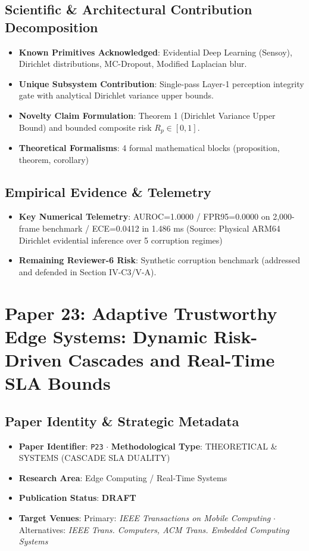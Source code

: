 \documentclass[11pt,a4paper]{article}
\begin{document}
\subsection*{Scientific & Architectural Contribution Decomposition}
\begin{itemize}[leftmargin=1.5em, itemsep=0.2em]
    \item \textbf{Known Primitives Acknowledged}: Evidential Deep Learning (Sensoy), Dirichlet distributions, MC-Dropout, Modified Laplacian blur.
    \item \textbf{Unique Subsystem Contribution}: Single-pass Layer-1 perception integrity gate with analytical Dirichlet variance upper bounds.
    \item \textbf{Novelty Claim Formulation}: Theorem 1 (Dirichlet Variance Upper Bound) and bounded composite risk $R_p \in [0,1]$.
    \item \textbf{Theoretical Formalisms}: 4 formal mathematical blocks (proposition, theorem, corollary)
\end{itemize}

\subsection*{Empirical Evidence & Telemetry}
\begin{itemize}[leftmargin=1.5em, itemsep=0.2em]
    \item \textbf{Key Numerical Telemetry}: AUROC=1.0000 / FPR95=0.0000 on 2,000-frame benchmark / ECE=0.0412 in 1.486 ms (Source: Physical ARM64 Dirichlet evidential inference over 5 corruption regimes)
    \item \textbf{Remaining Reviewer-6 Risk}: Synthetic corruption benchmark (addressed and defended in Section IV-C3/V-A).
\end{itemize}

\section{Paper 23: Adaptive Trustworthy Edge Systems: Dynamic Risk-Driven Cascades and Real-Time SLA Bounds}

\subsection*{Paper Identity \& Strategic Metadata}
\begin{itemize}[leftmargin=1.5em, itemsep=0.2em]
    \item \textbf{Paper Identifier}: \texttt{P23} $\cdot$ \textbf{Methodological Type}: THEORETICAL \& SYSTEMS (CASCADE SLA DUALITY)
    \item \textbf{Research Area}: Edge Computing / Real-Time Systems
    \item \textbf{Publication Status}: \textbf{DRAFT}
    \item \textbf{Target Venues}: Primary: \textit{IEEE Transactions on Mobile Computing} $\cdot$ Alternatives: \textit{IEEE Trans. Computers, ACM Trans. Embedded Computing Systems}
\end{itemize}
\end{document}
